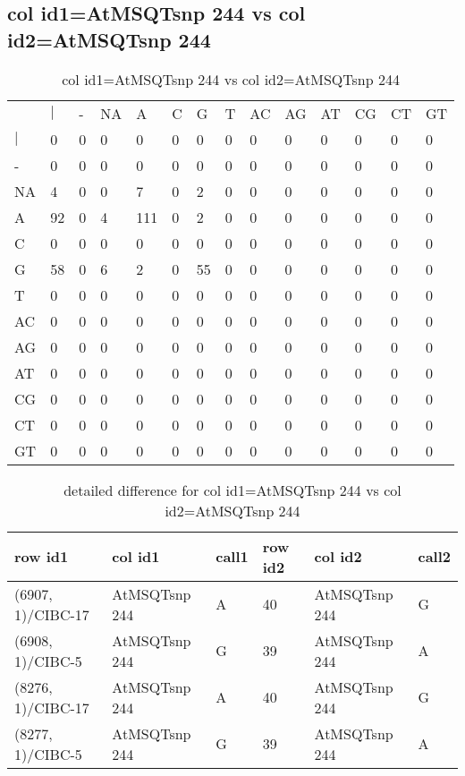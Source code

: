 \subsection{col id1=AtMSQTsnp 244 vs col id2=AtMSQTsnp 244}
\begin{center}
\begin{longtable}{|l|l|l|l|l|l|l|l|l|l|l|l|l|l|}
\caption{col id1=AtMSQTsnp 244 vs col id2=AtMSQTsnp 244} \label{table_dm800}\\
\hline
\\
\hline
&$|$&-&NA&A&C&G&T&AC&AG&AT&CG&CT&GT\\
$|$&0&0&0&0&0&0&0&0&0&0&0&0&0\\
-&0&0&0&0&0&0&0&0&0&0&0&0&0\\
NA&4&0&0&7&0&2&0&0&0&0&0&0&0\\
A&92&0&4&111&0&2&0&0&0&0&0&0&0\\
C&0&0&0&0&0&0&0&0&0&0&0&0&0\\
G&58&0&6&2&0&55&0&0&0&0&0&0&0\\
T&0&0&0&0&0&0&0&0&0&0&0&0&0\\
AC&0&0&0&0&0&0&0&0&0&0&0&0&0\\
AG&0&0&0&0&0&0&0&0&0&0&0&0&0\\
AT&0&0&0&0&0&0&0&0&0&0&0&0&0\\
CG&0&0&0&0&0&0&0&0&0&0&0&0&0\\
CT&0&0&0&0&0&0&0&0&0&0&0&0&0\\
GT&0&0&0&0&0&0&0&0&0&0&0&0&0\\
\hline
\end{longtable}
\end{center}

\begin{center}
\begin{longtable}{|l|l|l|l|l|l|}
\caption{detailed difference for col id1=AtMSQTsnp 244 vs col id2=AtMSQTsnp 244} \label{table_dm801}\\
\hline
row id1&col id1&call1&row id2&col id2&call2\\
\hline
(6907, 1)/CIBC-17&AtMSQTsnp 244&A&40&AtMSQTsnp 244&G\\
(6908, 1)/CIBC-5&AtMSQTsnp 244&G&39&AtMSQTsnp 244&A\\
(8276, 1)/CIBC-17&AtMSQTsnp 244&A&40&AtMSQTsnp 244&G\\
(8277, 1)/CIBC-5&AtMSQTsnp 244&G&39&AtMSQTsnp 244&A\\
\hline
\end{longtable}
\end{center}

